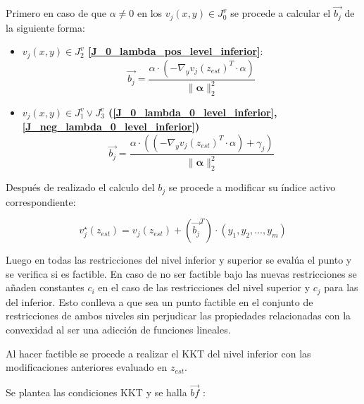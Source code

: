 %
Primero en caso de que $\alpha \neq 0$ en los $v_j(x,y) \in J_0^v$ se procede a calcular el $\vec{b_j}$ de la siguiente forma:

\begin{itemize}
    \item \textbf{ $v_j(x,y) \in J_2^v$ \ref{J_0_lambda_pos_level_inferior}}:
        \begin{equation}
            \vec{b_j}=  \frac{{\alpha} \cdot (-\nabla_{y}{v_j(z_{est})}^T \cdot \alpha)}{\|\mathbf{\alpha} \|_2^2}
        \end{equation}
    \item \textbf{$v_j(x,y) \in J_1^v \lor J_3^v$ (\ref{J_0_lambda_0_level_inferior},\ref{J_neg_lambda_0_level_inferior})}\\
    \begin{equation}
        \vec{b_j}=  \frac{{\alpha} \cdot ((-\nabla_{y}{v_j(z_{est})}^T \cdot \alpha)+\gamma_j)}{\|\mathbf{\alpha} \|_2^2}
    \end{equation}
\end{itemize}


Después de realizado el calculo del $b_j$ se procede a modificar su índice activo correspondiente:

\begin{equation}
	v_{j}^{\star}(z_{est})=v_{j}(z_{est})+ ({\vec{b_j}}^T)\cdot (y_1,y_2,\dots,y_m)
\end{equation}
%

Luego en todas las restricciones del nivel inferior y superior
se evalúa el punto y se verifica si es factible. En caso de no ser factible 
bajo las nuevas restricciones se añaden constantes $c_i$ en el caso de las restricciones del
nivel superior y $c_j$ para las del inferior. Esto conlleva a que sea un punto factible en el conjunto
de restricciones de ambos niveles sin perjudicar las propiedades relacionadas con la convexidad al ser una adicción
de funciones lineales. 

Al hacer factible se procede a realizar el KKT del nivel inferior con las modificaciones anteriores evaluado en $z_{est}$.

Se plantea las condiciones KKT y se halla $\vec{bf}$ :

